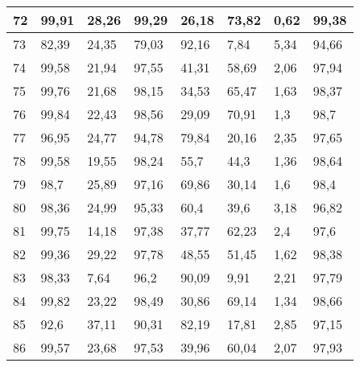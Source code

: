 \begin{longtable}[c]{|l|l|l|l|l|l|l|l|}
72              & 99,91        & 28,26        & 99,29       & 26,18         & 73,82         & 0,62          & 99,38         \\ \hline
73              & 82,39        & 24,35        & 79,03       & 92,16         & 7,84          & 5,34          & 94,66         \\ \hline
74              & 99,58        & 21,94        & 97,55       & 41,31         & 58,69         & 2,06          & 97,94         \\ \hline
75              & 99,76        & 21,68        & 98,15       & 34,53         & 65,47         & 1,63          & 98,37         \\ \hline
76              & 99,84        & 22,43        & 98,56       & 29,09         & 70,91         & 1,3           & 98,7          \\ \hline
77              & 96,95        & 24,77        & 94,78       & 79,84         & 20,16         & 2,35          & 97,65         \\ \hline
78              & 99,58        & 19,55        & 98,24       & 55,7          & 44,3          & 1,36          & 98,64         \\ \hline
79              & 98,7         & 25,89        & 97,16       & 69,86         & 30,14         & 1,6           & 98,4          \\ \hline
80              & 98,36        & 24,99        & 95,33       & 60,4          & 39,6          & 3,18          & 96,82         \\ \hline
81              & 99,75        & 14,18        & 97,38       & 37,77         & 62,23         & 2,4           & 97,6          \\ \hline
82              & 99,36        & 29,22        & 97,78       & 48,55         & 51,45         & 1,62          & 98,38         \\ \hline
83              & 98,33        & 7,64         & 96,2        & 90,09         & 9,91          & 2,21          & 97,79         \\ \hline
84              & 99,82        & 23,22        & 98,49       & 30,86         & 69,14         & 1,34          & 98,66         \\ \hline
85              & 92,6         & 37,11        & 90,31       & 82,19         & 17,81         & 2,85          & 97,15         \\ \hline
86              & 99,57        & 23,68        & 97,53       & 39,96         & 60,04         & 2,07          & 97,93         \\ \hline

\end{longtable}
